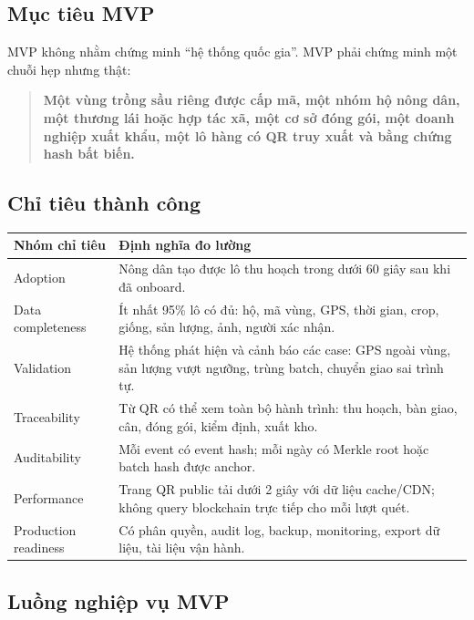 \documentclass[12pt,a4paper]{article}
\begin{document}
\subsection{Mục tiêu MVP}

MVP không nhằm chứng minh ``hệ thống quốc gia''. MVP phải chứng minh một chuỗi hẹp nhưng thật:

\begin{quote}
\textbf{Một vùng trồng sầu riêng được cấp mã, một nhóm hộ nông dân, một thương lái hoặc hợp tác xã, một cơ sở đóng gói, một doanh nghiệp xuất khẩu, một lô hàng có QR truy xuất và bằng chứng hash bất biến.}
\end{quote}

\subsection{Chỉ tiêu thành công}

\begin{longtable}{p{5cm}p{8.5cm}}
\toprule
\textbf{Nhóm chỉ tiêu} & \textbf{Định nghĩa đo lường} \\
\midrule
\endhead
Adoption & Nông dân tạo được lô thu hoạch trong dưới 60 giây sau khi đã onboard. \\
\addlinespace
Data completeness & Ít nhất 95\% lô có đủ: hộ, mã vùng, GPS, thời gian, crop, giống, sản lượng, ảnh, người xác nhận. \\
\addlinespace
Validation & Hệ thống phát hiện và cảnh báo các case: GPS ngoài vùng, sản lượng vượt ngưỡng, trùng batch, chuyển giao sai trình tự. \\
\addlinespace
Traceability & Từ QR có thể xem toàn bộ hành trình: thu hoạch, bàn giao, cân, đóng gói, kiểm định, xuất kho. \\
\addlinespace
Auditability & Mỗi event có event hash; mỗi ngày có Merkle root hoặc batch hash được anchor. \\
\addlinespace
Performance & Trang QR public tải dưới 2 giây với dữ liệu cache/CDN; không query blockchain trực tiếp cho mỗi lượt quét. \\
\addlinespace
Production readiness & Có phân quyền, audit log, backup, monitoring, export dữ liệu, tài liệu vận hành. \\
\bottomrule
\end{longtable}

\subsection{Luồng nghiệp vụ MVP}
\end{document}
